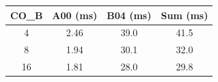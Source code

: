 \begin{tabular}{cccc}
\hline
\rowcolor{headgrey}
\textbf{CO\_B} & \textbf{A00 (ms)} & \textbf{B04 (ms)} & \textbf{Sum (ms)} \\ \hline
4 & 2.46 & 39.0 & 41.5 \\
8 & 1.94 & 30.1 & 32.0 \\
16 & 1.81 & 28.0 & 29.8 \\
\hline
\end{tabular}
